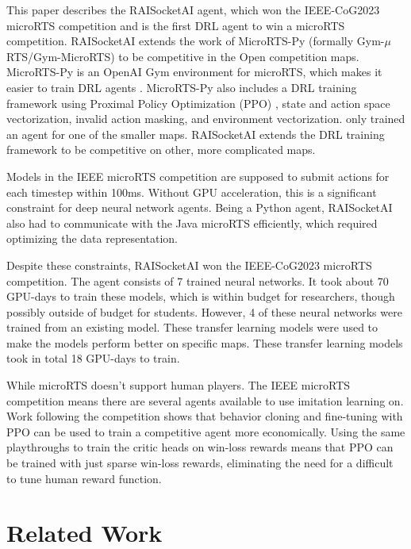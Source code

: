 \documentclass{article}
\begin{document}
This paper describes the RAISocketAI agent, which won the IEEE-CoG2023 microRTS
competition and is the first DRL agent to win a microRTS competition. RAISocketAI
extends the work of MicroRTS-Py (formally Gym-$\mu$RTS/Gym-MicroRTS) to be competitive
in the Open competition maps. MicroRTS-Py is an OpenAI Gym environment for microRTS,
which makes it easier to train DRL agents \citep{DBLP:journals/corr/abs-2105-13807}.
MicroRTS-Py also includes a DRL training framework using Proximal Policy Optimization
(PPO) \citep{DBLP:journals/corr/SchulmanWDRK17}, state and action space vectorization,
invalid action masking, and environment vectorization.
\citet{DBLP:journals/corr/abs-2105-13807} only trained an agent for one of the smaller
maps. RAISocketAI extends the DRL training framework to be competitive on other, more
complicated maps.

Models in the IEEE microRTS competition are supposed to submit actions for each timestep
within 100ms. Without GPU acceleration, this is a significant constraint for deep neural
network agents. Being a Python agent, RAISocketAI also had to communicate with the Java
microRTS efficiently, which required optimizing the data representation.

Despite these constraints, RAISocketAI won the IEEE-CoG2023 microRTS competition. The
agent consists of 7 trained neural networks. It took about 70 GPU-days to train these
models, which is within budget for researchers, though possibly outside of budget for
students. However, 4 of these neural networks were trained from an existing model. These
transfer learning models were used to make the models perform better on specific maps.
These transfer learning models took in total 18 GPU-days to train.

While microRTS doesn't support human players. The IEEE microRTS competition means there
are several agents available to use imitation learning on. Work following the
competition shows that behavior cloning and fine-tuning with PPO can be used to train a
competitive agent more economically. Using the same playthroughs to train the critic
heads on win-loss rewards means that PPO can be trained with just sparse win-loss
rewards, eliminating the need for a difficult to tune human reward function.

\section{Related Work}
\end{document}
